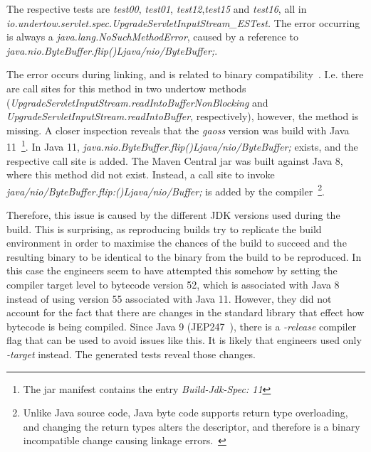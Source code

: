 \documentclass[conference]{IEEEtran}
\begin{document}
The respective tests are \textit{test00}, \textit{test01}, \textit{test12},\textit{test15} and \textit{test16}, all in \textit{io.under\-tow.\-servlet.\-spec.UpgradeServletInputStream\_ESTest.} The error occurring is always a \textit{java.lang.NoSuchMethodError}, caused by a reference to \textit{java.nio.ByteBuffer.flip()Ljava/nio/ByteBuffer;}.

The error occurs during linking, and is related to binary compatibility~\cite{JVM17Spec}. I.e. there are call sites for this method in two undertow methods (\textit{UpgradeServletInputStream.readIntoBufferNonBlocking} and \textit{UpgradeServletInputStream.readIntoBuffer}, respectively), however, the method is missing. 
A closer inspection reveals that the \textit{gaoss} version was build with Java 11~\footnote{The jar manifest contains the entry \textit{Build-Jdk-Spec: 11}}. In Java 11, \textit{java.nio.ByteBuffer.flip()Ljava/nio/ByteBuffer;} exists, and the respective call site is added. The Maven Central jar was built against Java 8, where this method did not exist.  Instead, a call site to invoke \textit{java/nio/ByteBuffer.flip:()Ljava/nio/Buffer;} is added by the compiler~\footnote{Unlike Java source code, Java byte code supports return type overloading, and changing the return types alters the descriptor, and therefore is a binary incompatible change causing linkage errors.~\cite{JVM17Spec,dietrich2014broken}}.

Therefore, this issue is caused by the different JDK versions used during the build. This is surprising, as reproducing builds try to replicate the build environment in order to maximise the chances of the build to succeed and the resulting binary to be identical to the binary from the build to be reproduced. In this case the engineers seem to have attempted this somehow by setting the compiler target level to bytecode version 52, which is associated with Java 8~\cite[Sect. 4.1]{JVM17Spec} instead of using version 55 associated with Java 11.  However, they did not account for the fact that there are changes in the standard library that effect how bytecode is being compiled. Since Java 9 (JEP247~\cite{jep247}), there is a \textit{-release} compiler  flag that can be used to avoid issues like this. It is likely that engineers used only \textit{-target} instead. The generated tests reveal those changes.  
\end{document}
